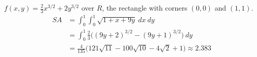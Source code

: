 {$f(x,y) = \frac23x^{3/2}+2y^{3/2}$ over $R$, the rectangle with corners $(0,0)$ and $(1,1)$.
}
{
\begin{align*}SA &= \int_{0}^{1}\int_{0}^{1} \sqrt{1+ x+9y}\ dx\ dy\\
		&= \int_0^{1}\frac23\Big((9y+2)^{3/2}-(9y+1)^{3/2}\Big)\ dy \\
		&= \frac{4}{135}\big(121\sqrt{11}-100\sqrt{10}-4\sqrt{2}+1\big)\approx 2.383
\end{align*}
}